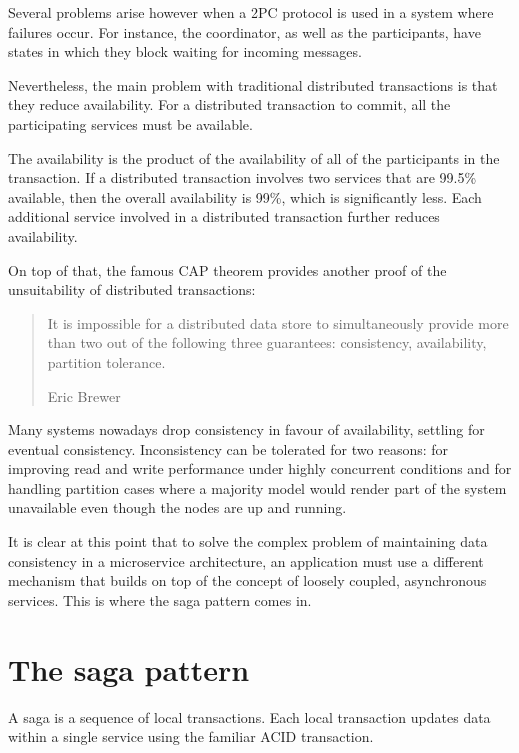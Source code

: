 \documentclass[conference]{IEEEtran}
\begin{document}
Several problems arise however when a 2PC protocol is used in a system where failures occur. For instance, the coordinator, as well as the participants, have states in which they block waiting for incoming messages. \cite{distributed-systems-2pc}

Nevertheless, the main problem with traditional distributed transactions is that they reduce availability. For a distributed transaction to commit, all the participating services must be available.

The availability is the product of the availability of all of the participants in the transaction. If a distributed transaction involves two services that are 99.5\% available, then the overall availability is 99\%, which is significantly less. Each additional service involved in a distributed transaction further reduces availability.

On top of that, the famous CAP theorem provides another proof of the unsuitability of distributed transactions:

\begin{quote}
It is impossible for a distributed data store to simultaneously provide more than two out of the following three guarantees: consistency, availability, partition tolerance.

\hfill Eric Brewer
\end{quote}
 

Many systems nowadays drop consistency in favour of availability, settling for eventual consistency. Inconsistency can be tolerated for two reasons: for improving read and write performance under highly concurrent conditions and for handling partition cases where a majority model would render part of the system unavailable even though the nodes are up and running. \cite{consistency-vs-availability}

It is clear at this point that to solve the complex problem of maintaining data consistency in a microservice architecture, an application must use a different mechanism that builds on top of the concept of loosely coupled, asynchronous services. This is where the saga pattern comes in.

\section{The saga pattern}

A saga is a sequence of local transactions. Each local transaction updates data within a single service using the familiar ACID transaction.
\end{document}
